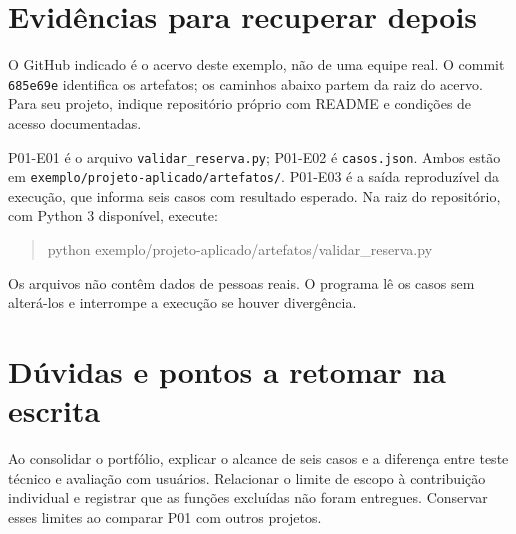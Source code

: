 \section*{Evidências para recuperar depois}
O GitHub indicado é o acervo deste exemplo, não de uma equipe real.
O commit \texttt{685e69e} identifica os artefatos; os caminhos abaixo partem
da raiz do acervo. Para seu projeto, indique repositório próprio com README
e condições de acesso documentadas.

P01-E01 é o arquivo \texttt{validar\_reserva.py}; P01-E02 é \texttt{casos.json}.
Ambos estão em \texttt{exemplo/projeto-aplicado/artefatos/}. P01-E03 é a saída
reproduzível da execução, que informa seis casos com resultado esperado.
Na raiz do repositório, com Python 3 disponível, execute:
\begin{quote}\small\ttfamily
python exemplo/projeto-aplicado/artefatos/validar\_reserva.py
\end{quote}
Os arquivos não contêm dados de pessoas reais. O programa lê os casos sem
alterá-los e interrompe a execução se houver divergência.

\section*{Dúvidas e pontos a retomar na escrita}
Ao consolidar o portfólio, explicar o alcance de seis casos e a diferença
entre teste técnico e avaliação com usuários. Relacionar o limite de escopo
à contribuição individual e registrar que as funções excluídas não foram
entregues. Conservar esses limites ao comparar P01 com outros projetos.
